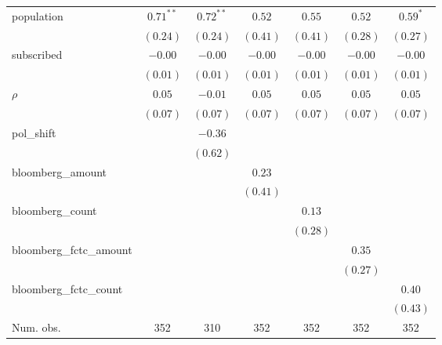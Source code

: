 \begin{table}[!h]
\begin{center}
\begin{tabular}{l c c c c c c }
population              & $0.71^{**}$  & $0.72^{**}$  & $0.52$       & $0.55$       & $0.52$       & $0.59^{*}$   \\
                        & $(0.24)$     & $(0.24)$     & $(0.41)$     & $(0.41)$     & $(0.28)$     & $(0.27)$     \\
subscribed              & $-0.00$      & $-0.00$      & $-0.00$      & $-0.00$      & $-0.00$      & $-0.00$      \\
                        & $(0.01)$     & $(0.01)$     & $(0.01)$     & $(0.01)$     & $(0.01)$     & $(0.01)$     \\
$\rho$                  & $0.05$       & $-0.01$      & $0.05$       & $0.05$       & $0.05$       & $0.05$       \\
                        & $(0.07)$     & $(0.07)$     & $(0.07)$     & $(0.07)$     & $(0.07)$     & $(0.07)$     \\
pol\_shift              &              & $-0.36$      &              &              &              &              \\
                        &              & $(0.62)$     &              &              &              &              \\
bloomberg\_amount       &              &              & $0.23$       &              &              &              \\
                        &              &              & $(0.41)$     &              &              &              \\
bloomberg\_count        &              &              &              & $0.13$       &              &              \\
                        &              &              &              & $(0.28)$     &              &              \\
bloomberg\_fctc\_amount &              &              &              &              & $0.35$       &              \\
                        &              &              &              &              & $(0.27)$     &              \\
bloomberg\_fctc\_count  &              &              &              &              &              & $0.40$       \\
                        &              &              &              &              &              & $(0.43)$     \\
\midrule
Num. obs.               & 352          & 310          & 352          & 352          & 352          & 352          \\

\end{tabular}
\end{center}
\end{table}
